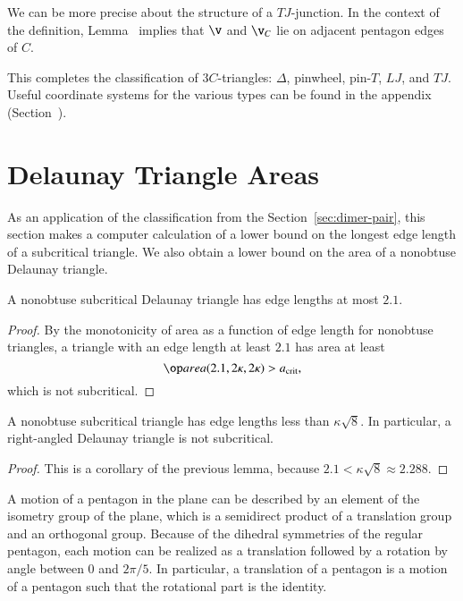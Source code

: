 We can be more precise about the structure of a $TJ$-junction.  In the
context of the definition, Lemma~ implies that $\v$
and $\v_C$ lie on adjacent pentagon edges of $C$.

This completes the classification of $3C$-triangles: $\Delta$,
pinwheel, pin-$T$, $LJ$, and $TJ$.  Useful coordinate systems for the
various types can be found in the appendix
(Section~).

\section{Delaunay Triangle Areas}

As an application of the classification from the Section~\ref{sec:dimer-pair},
this section makes a computer calculation of a lower bound on the
longest edge length of a subcritical triangle.  We also obtain a lower
bound on the area of a nonobtuse Delaunay triangle.

\begin{lemma} 
  A nonobtuse subcritical Delaunay triangle has edge lengths at most $2.1$.
\end{lemma}

\begin{proof} By the monotonicity of area as a function of edge length
  for nonobtuse triangles, a triangle with an edge length at least
  $2.1$ has area at least
\[
\area(2.1,2\kappa,2\kappa) > \acrit,
\] %
which is not subcritical.
\end{proof}

\begin{lemma} 
  A nonobtuse subcritical triangle has edge lengths less than
  $\kappa\sqrt8$.  In particular, a right-angled Delaunay triangle is
  not subcritical.
\end{lemma}

\begin{proof}  
  This is a corollary of the previous lemma, because $2.1 <
  \kappa\sqrt8 \approx 2.288$.
\end{proof}

\begin{remark}
  A motion of a pentagon in the plane can be described by an element
  of the isometry group of the plane, which is a semidirect product of
  a translation group and an orthogonal group.  Because of the
  dihedral symmetries of the regular pentagon, each motion can be
  realized as a translation followed by a rotation by angle between
  $0$ and $2\pi/5$.  In particular, a translation of a pentagon is a
  motion of a pentagon such that the rotational part is the identity.
\end{remark}


